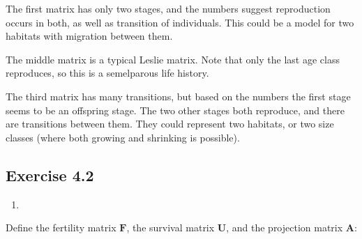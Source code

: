 \documentclass[
]{book}
\providecommand{\tightlist}{%
  \setlength{\itemsep}{0pt}\setlength{\parskip}{0pt}}
\begin{document}
The first matrix has only two stages, and the numbers suggest reproduction occurs in both, as well as transition of individuals. This could be a model for two habitats with migration between them.

The middle matrix is a typical Leslie matrix. Note that only the last age class reproduces, so this is a semelparous life history.

The third matrix has many transitions, but based on the numbers the first stage seems to be an offspring stage. The two other stages both reproduce, and there are transitions between them. They could represent two habitats, or two size classes (where both growing and shrinking is possible).

\hypertarget{exercise-4.2-1}{%
\subsection*{Exercise 4.2}\label{exercise-4.2-1}}

\begin{enumerate}
\def\labelenumi{\arabic{enumi}.}
\tightlist
\item
\end{enumerate}

Define the fertility matrix \(\mathbf{F}\), the survival matrix \(\mathbf{U}\), and the projection matrix \(\mathbf{A}\):
\end{document}
